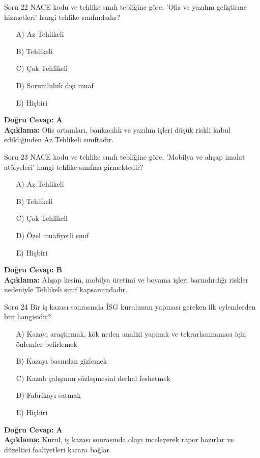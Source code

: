 \documentclass[12pt,a4paper]{article}
\begin{document}
\begin{testcard}{Soru 22}
    NACE kodu ve tehlike sınıfı tebliğine göre, 'Ofis ve yazılım geliştirme hizmetleri' hangi tehlike sınıfındadır?
    \begin{itemize}
        \item[A)] Az Tehlikeli
        \item[B)] Tehlikeli
        \item[C)] Çok Tehlikeli
        \item[D)] Sorumluluk dışı muaf
        \item[E)] Hiçbiri
    \end{itemize}
    \tcblower
    \textbf{Doğru Cevap: A} \\
    \textbf{Açıklama:} Ofis ortamları, bankacılık ve yazılım işleri düşük riskli kabul edildiğinden Az Tehlikeli sınıftadır.
\end{testcard}

\begin{testcard}{Soru 23}
    NACE kodu ve tehlike sınıfı tebliğine göre, 'Mobilya ve ahşap imalat atölyeleri' hangi tehlike sınıfına girmektedir?
    \begin{itemize}
        \item[A)] Az Tehlikeli
        \item[B)] Tehlikeli
        \item[C)] Çok Tehlikeli
        \item[D)] Özel muafiyetli sınıf
        \item[E)] Hiçbiri
    \end{itemize}
    \tcblower
    \textbf{Doğru Cevap: B} \\
    \textbf{Açıklama:} Ahşap kesim, mobilya üretimi ve boyama işleri barındırdığı riskler nedeniyle Tehlikeli sınıf kapsamındadır.
\end{testcard}

\begin{testcard}{Soru 24}
    Bir iş kazası sonrasında İSG kurulunun yapması gereken ilk eylemlerden biri hangisidir?
    \begin{itemize}
        \item[A)] Kazayı araştırmak, kök neden analizi yapmak ve tekrarlanmaması için önlemler belirlemek
        \item[B)] Kazayı basından gizlemek
        \item[C)] Kazalı çalışanın sözleşmesini derhal feshetmek
        \item[D)] Fabrikayı satmak
        \item[E)] Hiçbiri
    \end{itemize}
    \tcblower
    \textbf{Doğru Cevap: A} \\
    \textbf{Açıklama:} Kurul, iş kazası sonrasında olayı inceleyerek rapor hazırlar ve düzeltici faaliyetleri karara bağlar.
\end{testcard}
\end{document}
